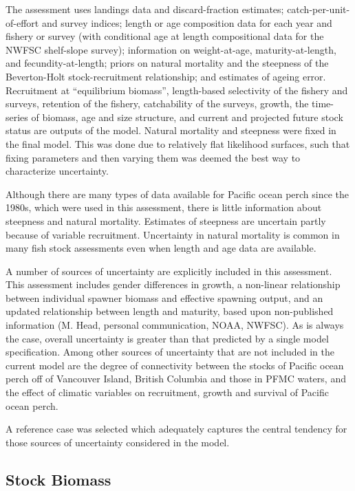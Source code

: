 \documentclass[12pt,]{article}
\begin{document}
The assessment uses landings data and discard-fraction estimates;
catch-per-unit-of-effort and survey indices; length or age composition
data for each year and fishery or survey (with conditional age at length
compositional data for the NWFSC shelf-slope survey); information on
weight-at-age, maturity-at-length, and fecundity-at-length; priors on
natural mortality and the steepness of the Beverton-Holt
stock-recruitment relationship; and estimates of ageing error.
Recruitment at ``equilibrium biomass'', length-based selectivity of the
fishery and surveys, retention of the fishery, catchability of the
surveys, growth, the time-series of biomass, age and size structure, and
current and projected future stock status are outputs of the model.
Natural mortality and steepness were fixed in the final model. This was
done due to relatively flat likelihood surfaces, such that fixing
parameters and then varying them was deemed the best way to characterize
uncertainty.

Although there are many types of data available for Pacific ocean perch
since the 1980s, which were used in this assessment, there is little
information about steepness and natural mortality. Estimates of
steepness are uncertain partly because of variable recruitment.
Uncertainty in natural mortality is common in many fish stock
assessments even when length and age data are available.

A number of sources of uncertainty are explicitly included in this
assessment. This assessment includes gender differences in growth, a
non-linear relationship between individual spawner biomass and effective
spawning output, and an updated relationship between length and
maturity, based upon non-published information (M. Head, personal
communication, NOAA, NWFSC). As is always the case, overall uncertainty
is greater than that predicted by a single model specification. Among
other sources of uncertainty that are not included in the current model
are the degree of connectivity between the stocks of Pacific ocean perch
off of Vancouver Island, British Columbia and those in PFMC waters, and
the effect of climatic variables on recruitment, growth and survival of
Pacific ocean perch.

A reference case was selected which adequately captures the central
tendency for those sources of uncertainty considered in the model.

\subsection*{Stock Biomass}\label{stock-biomass}
\end{document}
